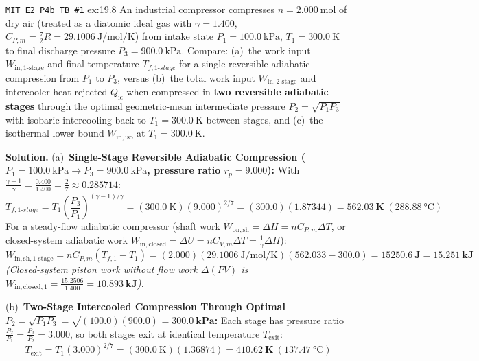\begin{workedexample}{\texttt{MIT E2 P4b TB \#1} }{ex:19.8}
An industrial compressor compresses $n = \SI{2.000}{\mole}$ of dry air (treated as a diatomic ideal gas with $\gamma = 1.400$, $C_{P,m} = \frac{7}{2}R = \SI{29.1006}{\joule\per\mole\per\kelvin}$) from intake state $P_1 = \SI{100.0}{\kilo\pascal}$, $T_1 = \SI{300.0}{\kelvin}$ to final discharge pressure $P_3 = \SI{900.0}{\kilo\pascal}$. Compare: (a)~the work input $W_{\mathrm{in,1\text{-}stage}}$ and final temperature $T_{f,1\text{-}stage}$ for a single reversible adiabatic compression from $P_1$ to $P_3$, versus (b)~the total work input $W_{\mathrm{in,2\text{-}stage}}$ and intercooler heat rejected $Q_{\mathrm{ic}}$ when compressed in \textbf{two reversible adiabatic stages} through the optimal geometric-mean intermediate pressure $P_2 = \sqrt{P_1 P_3}$ with isobaric intercooling back to $T_1 = \SI{300.0}{\kelvin}$ between stages, and (c)~the isothermal lower bound $W_{\mathrm{in,iso}}$ at $T_1 = \SI{300.0}{\kelvin}$.
\par\smallskip\noindent
\textbf{Solution.}
(a)~\textbf{Single-Stage Reversible Adiabatic Compression ($P_1 = \SI{100.0}{\kilo\pascal} \to P_3 = \SI{900.0}{\kilo\pascal}$, pressure ratio $r_p = 9.000$):}
With $\frac{\gamma - 1}{\gamma} = \frac{0.400}{1.400} = \frac{2}{7} \approx 0.285714$:
$$T_{f,1\text{-}stage} = T_1\left(\frac{P_3}{P_1}\right)^{(\gamma-1)/\gamma} = (\SI{300.0}{\kelvin})(9.000)^{2/7} = (300.0)(1.87344) = \mathbf{\SI{562.03}{\kelvin}}\ (\SI{288.88}{\celsius})$$
For a steady-flow adiabatic compressor (shaft work $\dot{W}_{\mathrm{on,sh}} = \Delta H = n C_{P,m}\Delta T$, or closed-system adiabatic work $W_{\mathrm{in,closed}} = \Delta U = n C_{V,m}\Delta T = \frac{1}{\gamma}\Delta H$):
$$W_{\mathrm{in,sh,1\text{-}stage}} = n C_{P,m}(T_{f,1} - T_1) = (2.000)(\SI{29.1006}{\joule\per\mole\per\kelvin})(562.033 - 300.0) = \mathbf{\SI{15250.6}{\joule}} = \mathbf{\SI{15.251}{\kilo\joule}}$$
\emph{(Closed-system piston work without flow work $\Delta(PV)$ is $W_{\mathrm{in,closed,1}} = \frac{15.2506}{1.400} = \mathbf{\SI{10.893}{\kilo\joule}}$).}
\par\smallskip\noindent
(b)~\textbf{Two-Stage Intercooled Compression Through Optimal $P_2 = \sqrt{P_1 P_3} = \sqrt{(100.0)(900.0)} = \mathbf{\SI{300.0}{\kilo\pascal}}$:}
Each stage has pressure ratio $\frac{P_2}{P_1} = \frac{P_3}{P_2} = 3.000$, so both stages exit at identical temperature $T_{\mathrm{exit}}$:
$$T_{\mathrm{exit}} = T_1(3.000)^{2/7} = (\SI{300.0}{\kelvin})(1.36874) = \mathbf{\SI{410.62}{\kelvin}}\ (\SI{137.47}{\celsius})$$

\end{workedexample}
